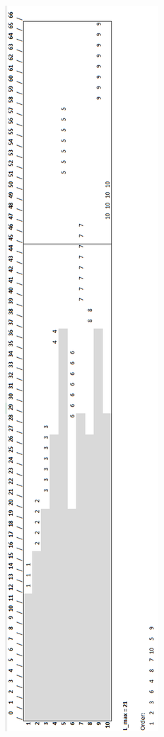 \documentclass[10pt,a4paper]{article}
\begin{document}
\begin{figure}[H]
	\centering
	\includegraphics[height=1.1\textheight]{q3_2}
\end{figure}
\newpage
\end{document}
